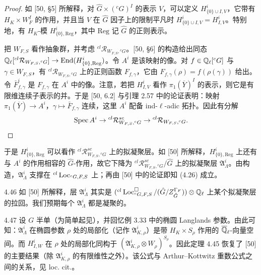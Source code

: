 \begin{proof}
如 [50, §5] 所解释，对 $\hat G\times({}^{c}G)^I$ 的表示 $V$，可以定义 $H^i_{\{0\}\cup I,V}$，它带有 $H_K\times W^I_F$ 的作用，并且当 $V$ 在 $\hat G$ 因子上的限制平凡时 $H^i_{\{0\}\cup I,V}=H^i_{I,V}$。特别地，有 $H_K$-模 $H^i_{\{0\},\mathrm{Reg}}$，其中 $\mathrm{Reg}$ 记 $\hat G$ 的正则表示。

把 $W_{F,S}$ 看作抽象群，并考虑 ${}^{cl}\mathcal R_{W_{F,S},{}^{c}G}$。[50, §6] 的构造给出同态 $\mathbb{Q}_\ell[{}^{cl}\mathcal R_{W_{F,S},{}^{c}G}]\to\operatorname{End}(H^i_{\{0\},\mathrm{Reg}})$。令 $A^i$ 是该映射的像。对 $f\in\mathbb{Q}_\ell[{}^{c}G]$ 与 $\gamma\in W_{F,S}$，有 ${}^{cl}\mathcal R_{W_{F,S},{}^{c}G}$ 上的正则函数 $F_{f,\gamma}$，它由 $F_{f,\gamma}(\rho)=f(\rho(\gamma))$ 给出。令 $\bar F^i_{f,\gamma}$ 是 $F_{f,\gamma}$ 在 $A^i$ 中的像。注意，若把 $H^i_{I,V}$ 看作 $\pi_1(\overline Y)^I$ 的表示，则它是有限维连续子表示的并。于是 [50, 6.2] 与引理 2.57 中的论证表明：映射 $\pi_1(\overline Y)\to A^i$，$\gamma\mapsto\bar F_{f,\gamma}$ 连续，这里 $A^i$ 配备 ind-$\ell$-adic 拓扑。因此有分解
\[
\operatorname{Spec} A^i\to{}^{cl}\mathcal R^{sc}_{W_{F,S},{}^{c}G}\to{}^{cl}\mathcal R_{W_{F,S},{}^{c}G}.
\]
\end{proof}

于是 $H^i_{\{0\},\mathrm{Reg}}$ 可以看作 ${}^{cl}\mathcal R^{sc}_{W_{F,S},{}^{c}G}$ 上的拟凝聚层。如 [50] 所解释，$H^i_{\{0\},\mathrm{Reg}}$ 上还有与 $A^i$ 的作用相容的 $\hat G$-作用，故它下降为 ${}^{cl}\mathcal R^{sc}_{W_{F,S},{}^{c}G}/\hat G$ 上的拟凝聚层 $\mathfrak A^i_\Lambda$。由构造，$\mathfrak A^i_\Lambda$ 支撑在 ${}^{cl}\operatorname{Loc}_{{}^{c}G,F,S}$ 上；再由 [50] 中的论证即知 (4.26) 成立。

\begin{rem}{4.46}\label{thm:a2-4-46}
如 [50] 所解释，层 $\mathfrak A^i_\Lambda$ 其实是 $({}^{cl}\operatorname{Loc}^{\square}_{{}^{c}G,F,S}/(\hat G/Z^{\Gamma_F}_{\hat G}))\otimes\mathbb{Q}_\ell$ 上某个拟凝聚层的拉回。我们预期每个 $\mathfrak A^i_\Lambda$ 都是凝聚的。
\end{rem}

\begin{exam}{4.47}\label{thm:a2-4-47}
设 $G$ 半单（为简单起见），并回忆例 3.33 中的椭圆 Langlands 参数。由此可知：$\mathfrak A^i_\Lambda$ 在椭圆参数 $\rho$ 处的局部化（记作 $\mathfrak A^i_{K,\rho}$）是带 $H_K\times S_\rho$ 作用的 $\overline{\mathbb{Q}}_\ell$-向量空间。而 $H^i_{I,W}$ 在 $\rho$ 处的局部化同构于 $(\mathfrak A^i_{K,\rho}\otimes W_\rho)^{S_\rho}$。因此定理 4.45 恢复了 [50] 的主要结果（除 $\mathfrak A^i_{K,\rho}$ 的有限维性之外）。该公式与 Arthur–Kottwitz 重数公式之间的关系，见 loc. cit.。
\end{exam}

